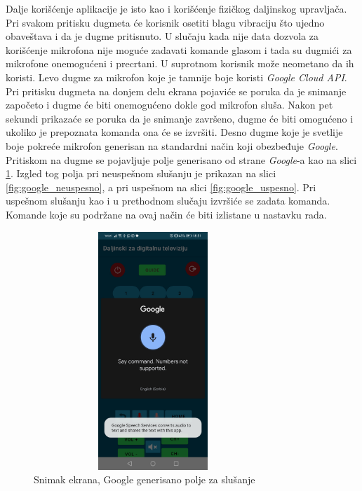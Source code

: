 \documentclass[implementacija.tex]{subfiles}
\begin{document}
Dalje korišćenje aplikacije je isto kao i korišćenje fizičkog daljinskog upravljača. Pri svakom pritisku dugmeta će korisnik osetiti blagu vibraciju što ujedno obaveštava i da je dugme pritisnuto. U slučaju kada nije data dozvola za korišćenje mikrofona nije moguće zadavati komande glasom i tada su dugmići za mikrofone onemogućeni i precrtani. U suprotnom korisnik može neometano da ih koristi. Levo dugme za mikrofon koje je tamnije boje koristi \textit{Google Cloud API}. Pri pritisku dugmeta na donjem delu ekrana pojaviće se poruka da je snimanje započeto i dugme će biti onemogućeno dokle god mikrofon sluša. Nakon pet sekundi prikazaće se poruka da je snimanje završeno, dugme će biti omogućeno i ukoliko je prepoznata komanda ona će se izvršiti. Desno dugme koje je svetlije boje pokreće mikrofon generisan na standardni način koji obezbeđuje \textit{Google}. Pritiskom na dugme se pojavljuje polje generisano od strane \textit{Google}-a kao na slici \ref{fig:google_slusanje}. Izgled tog polja pri neuspešnom slušanju je prikazan na slici \ref{fig:google_neuspesno}, a pri uspešnom na slici \ref{fig:google_uspesno}. Pri uspešnom slušanju kao i u prethodnom slučaju izvršiće se zadata komanda. Komande koje su podržane na ovaj način će biti izlistane u nastavku rada.  

\begin{figure}[h!]
  \centering
  \includegraphics[width=9cm,height=9cm,keepaspectratio]{Implementacija/snimci_ekrana/10_obican_google_slusanje.jpg}
  \caption{Snimak ekrana, Google generisano polje za slušanje}
   \label{fig:google_slusanje}
\end{figure}
\end{document}
